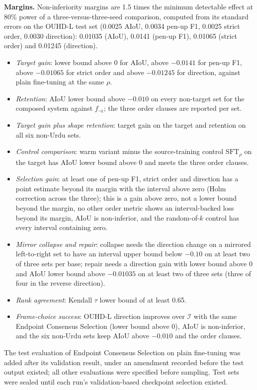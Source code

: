 \documentclass[10pt,a4paper]{article}
\newcommand{\fnot}[1]{f_{\neg\mathrm{#1}}}
\newcommand{\SFT}[1]{\mathrm{SFT}_{#1}}
\newcommand{\Fi}{\mathcal{I}}
\begin{document}
\textbf{Margins.} Non-inferiority margins are 1.5 times the minimum detectable effect at 80\% power of a three-versus-three-seed comparison, computed from its standard errors on the OUHD-L test set (0.0025 AIoU, 0.0034 pen-up F1, 0.0025 strict order, 0.0030 direction): 0.01035 (AIoU), 0.0141 (pen-up F1), 0.01065 (strict order) and 0.01245 (direction).

\begin{itemize}
\item \emph{Target gain}: lower bound above 0 for AIoU, above $-0.0141$ for pen-up F1, above $-0.01065$ for strict order and above $-0.01245$ for direction, against plain fine-tuning at the same $\rho$.
\item \emph{Retention}: AIoU lower bound above $-0.010$ on every non-target set for the composed system against $\fnot{t}$; the three order clauses are reported per set.
\item \emph{Target gain plus shape retention}: target gain on the target and retention on all six non-Urdu sets.
\item \emph{Control comparison}: warm variant minus the source-training control $\SFT{\rho}$ on the target has AIoU lower bound above 0 and meets the three order clauses.
\item \emph{Selection gain}: at least one of pen-up F1, strict order and direction has a point estimate beyond its margin with the interval above zero (Holm correction across the three); this is a gain above zero, not a lower bound beyond the margin, no other order metric shows an interval-backed loss beyond its margin, AIoU is non-inferior, and the random-of-$k$ control has every interval containing zero.
\item \emph{Mirror collapse and repair}: collapse needs the direction change on a mirrored left-to-right set to have an interval upper bound below $-0.10$ on at least two of three sets per base; repair needs a direction gain with lower bound above 0 and AIoU lower bound above $-0.01035$ on at least two of three sets (three of four in the reverse direction).
\item \emph{Rank agreement}: Kendall $\tau$ lower bound of at least 0.65.
\item \emph{Frame-choice success}: OUHD-L direction improves over $\Fi$ with the same Endpoint Consensus Selection (lower bound above 0), AIoU is non-inferior, and the six non-Urdu sets keep AIoU above $-0.010$ and the order clauses.
\end{itemize}
The test evaluation of Endpoint Consensus Selection on plain fine-tuning was added after its validation result, under an amendment recorded before the test output existed; all other evaluations were specified before sampling. Test sets were sealed until each run's validation-based checkpoint selection existed.
\end{document}
